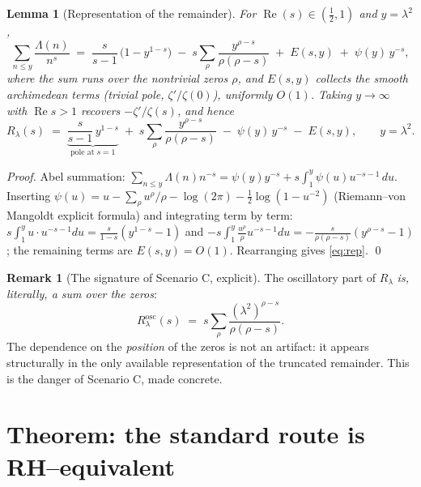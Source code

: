 \documentclass[11pt]{article}
\theoremstyle{plain}
\newtheorem{lemma}{Lemma}
\theoremstyle{definition}
\newtheorem{remark}{Remark}
\newcommand{\Lam}{\Lambda}
\DeclareMathOperator{\Real}{Re}
\newcommand{\half}{\tfrac12}
\begin{document}
\begin{lemma}[Representation of the remainder]\label{lem:rep}
For $\Real(s)\in(\half,1)$ and $y=\lambda^2$,
\begin{equation}\label{eq:rep}
  \sum_{n\le y}\frac{\Lam(n)}{n^{s}}
  \;=\;\frac{s}{s-1}\,\bigl(1-y^{1-s}\bigr)
  \;-\;s\sum_{\rho}\frac{y^{\rho-s}}{\rho(\rho-s)}
  \;+\;E(s,y)\;+\;\psi(y)\,y^{-s},
\end{equation}
where the sum runs over the nontrivial zeros $\rho$, and $E(s,y)$ collects the
smooth archimedean terms (trivial pole, $\zeta'/\zeta(0)$), uniformly
$O(1)$. Taking $y\to\infty$ with $\Real s>1$ recovers $-\zeta'/\zeta(s)$, and
hence
\begin{equation}\label{eq:Rrep}
  R_\lambda(s)\;=\;\underbrace{\frac{s}{s-1}\,y^{1-s}}_{\text{pole at }s=1}
  \;+\;s\sum_{\rho}\frac{y^{\rho-s}}{\rho(\rho-s)}
  \;-\;\psi(y)\,y^{-s}\;-\;E(s,y),
  \qquad y=\lambda^2 .
\end{equation}
\end{lemma}
\begin{proof}
Abel summation:
$\sum_{n\le y}\Lam(n)n^{-s}=\psi(y)y^{-s}+s\int_1^y\psi(u)u^{-s-1}\,du$.
Inserting $\psi(u)=u-\sum_\rho u^\rho/\rho-\log(2\pi)-\half\log(1-u^{-2})$
(Riemann--von Mangoldt explicit formula) and integrating term by term:
$s\int_1^y u\cdot u^{-s-1}du=\frac{s}{1-s}(y^{1-s}-1)$ and
$-s\int_1^y\frac{u^\rho}{\rho}u^{-s-1}du=-\frac{s}{\rho(\rho-s)}(y^{\rho-s}-1)$;
the remaining terms are $E(s,y)=O(1)$. Rearranging gives \eqref{eq:rep}. \qed
\end{proof}

\begin{remark}[The signature of Scenario C, explicit]\label{rem:C}
The oscillatory part of $R_\lambda$ \emph{is, literally, a sum over the zeros}:
\[
  R_\lambda^{\mathrm{osc}}(s)\;=\;s\sum_\rho\frac{(\lambda^2)^{\rho-s}}{\rho(\rho-s)} .
\]
The dependence on the \emph{position} of the zeros is not an artifact: it appears
structurally in the only available representation of the truncated remainder.
This is the danger of Scenario C, made concrete.
\end{remark}

\section{Theorem: the standard route is RH--equivalent}\label{sec:circ}
\end{document}
